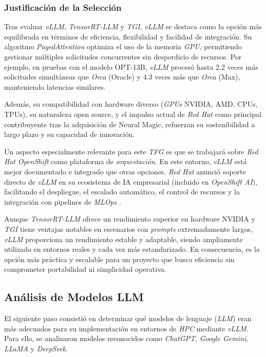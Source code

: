 \subsubsection*{Justificación de la Selección}
Tras evaluar \textit{vLLM}, \textit{TensorRT-LLM} y \textit{TGI}, \textit{vLLM} se destaca como la opción más equilibrada en términos de eficiencia, flexibilidad y facilidad de integración. Su algoritmo \textit{PagedAttention} optimiza el uso de la memoria \textit{GPU}, permitiendo gestionar múltiples solicitudes concurrentes sin desperdicio de recursos. Por ejemplo, en pruebas con el modelo OPT-13B, \textit{vLLM} procesó hasta 2.2 veces más solicitudes simultáneas que \textit{Orca} (Oracle) y 4.3 veces más que \textit{Orca} (Max), manteniendo latencias similares.

Además, su compatibilidad con hardware diverso (\textit{GPUs} NVIDIA, AMD, CPUs, TPUs), su naturaleza open source, y el impulso actual de \textit{Red Hat} como principal contribuyente tras la adquisición de Neural Magic, refuerzan su sostenibilidad a largo plazo y su capacidad de innovación.

Un aspecto especialmente relevante para este \textit{TFG} es que se trabajará sobre \textit{Red Hat} \textit{OpenShift} como plataforma de \textit{orquestación}. En este entorno, \textit{vLLM} está mejor documentado e integrado que otras opciones. \textit{Red Hat} anunció soporte directo de \textit{vLLM} en su ecosistema de IA empresarial (incluido en \textit{OpenShift AI}), facilitando el despliegue, el escalado automático, el control de recursos y la integración con pipelines de \textit{MLOps} \cite{ref40}.

Aunque \textit{TensorRT-LLM} ofrece un rendimiento superior en hardware NVIDIA y \textit{TGI} tiene ventajas notables en escenarios con \textit{prompts} extremadamente largos, \textit{vLLM} proporciona un rendimiento estable y adaptable, siendo ampliamente utilizado en entornos reales y cada vez más estandarizado. En consecuencia, es la opción más práctica y escalable para un proyecto que busca eficiencia sin comprometer portabilidad ni simplicidad operativa.

\newpage
\subsection{Análisis de Modelos LLM}
El siguiente paso consistió en determinar qué modelos de lenguaje (\textit{LLM}) eran más adecuados para su implementación en entornos de \textit{HPC} mediante \textit{vLLM}. Para ello, se analizaron modelos reconocidos como \textit{ChatGPT}, \textit{Google Gemini}, \textit{LLaMA} y \textit{DeepSeek}.

